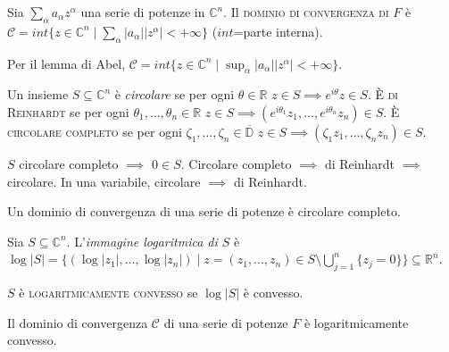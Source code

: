 \begin{defn}
  Sia $\displaystyle \sum_{\alpha} a_{\alpha}z^{\alpha}$ una serie di potenze in $\mathbb{C}^n$. Il \textsc{dominio di convergenza di $F$} è $\displaystyle \mathcal{C}=int\{z \in \mathbb{C}^n \mid \sum_{\alpha} |a_{\alpha}||z^{\alpha}|<+\infty\}$ ($int$=parte interna).
\end{defn}

\begin{oss}
  Per il lemma di Abel, $\displaystyle \mathcal{C}=int\{z \in \mathbb{C}^n \mid \sup_{\alpha} |a_{\alpha}||z^{\alpha}|<+\infty\}$.
\end{oss}

\begin{defn}
  Un insieme $S \subseteq \mathbb{C}^n$ è \textit{circolare} se per ogni $\theta \in \mathbb{R}$ $z \in S \implies e^{i\theta}z \in S$.
  È \textsc{di Reinhardt} se per ogni $\theta_1, \dots, \theta_n \in \mathbb{R}$ $z \in S \implies (e^{i\theta_1}z_1, \dots, e^{i\theta_n}z_n) \in S$.
  È \textsc{circolare completo} se per ogni $\zeta_1, \dots, \zeta_n \in \overline{\mathbb{D}}$ $z \in S \implies (\zeta_1z_1,\dots,\zeta_nz_n) \in S$.
\end{defn}

\begin{oss}
  $S$ circolare completo $\implies$ $0 \in S$. Circolare completo $\implies$ di Reinhardt $\implies$ circolare. In una variabile, circolare $\implies$ di Reinhardt.
\end{oss}

\begin{oss}
  Un dominio di convergenza di una serie di potenze è circolare completo.
\end{oss}

\begin{defn}
  Sia $S \subseteq \mathbb{C}^n$. L'\textit{immagine logaritmica di $S$} è $\displaystyle \log{|S|}=\{(\log{|z_1|}, \dots, \log{|z_n|}) \mid z=(z_1, \dots, z_n) \in S \setminus \bigcup_{j=1}^n \{z_j=0\} \} \subseteq \mathbb{R}^n$.
\end{defn}

\begin{defn}
  $S$ è \textsc{logaritmicamente convesso} se $\log{|S|}$ è convesso.
\end{defn}

\begin{prop}
  Il dominio di convergenza $\mathcal{C}$ di una serie di potenze $F$ è logaritmicamente convesso.
\end{prop}

